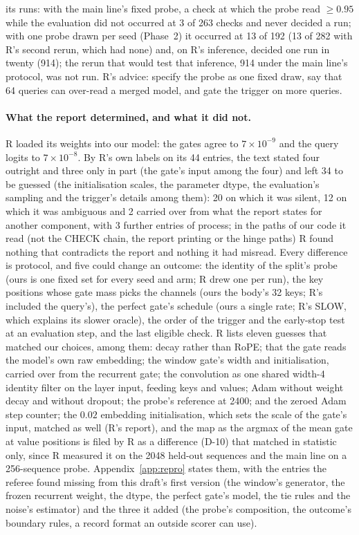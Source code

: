 \documentclass[11pt]{article}
\begin{document}
its runs: with the main line's fixed probe, a check at which the probe read $\geq 0.95$ while the evaluation did not occurred at 3 of 263 checks and never decided a run; with one probe drawn per seed (Phase~2) it occurred at 13 of 192 (13 of 282 with R's second rerun, which had none) and, on R's inference, decided one run in twenty (914); the rerun that would test that inference, 914 under the main line's protocol, was not run. R's advice: specify the probe as one fixed draw, say that 64 queries can over-read a merged model, and gate the trigger on more queries.

\paragraph{What the report determined, and what it did not.} R loaded its weights into our model: the gates agree to $7\times10^{-9}$ and the query logits to $7\times10^{-8}$. By R's own labels on its 44 entries, the text stated four outright and three only in part (the gate's input among the four) and left 34 to be guessed (the initialisation scales, the parameter dtype, the evaluation's sampling and the trigger's details among them): 20 on which it was silent, 12 on which it was ambiguous and 2 carried over from what the report states for another component, with 3 further entries of process; in the paths of our code it read (not the CHECK chain, the report printing or the hinge paths) R found nothing that contradicts the report and nothing it had misread. Every difference is protocol, and five could change an outcome: the identity of the split's probe (ours is one fixed set for every seed and arm; R drew one per run), the key positions whose gate mass picks the channels (ours the body's 32 keys; R's included the query's), the perfect gate's schedule (ours a single rate; R's SLOW, which explains its slower oracle), the order of the trigger and the early-stop test at an evaluation step, and the last eligible check. R lists eleven guesses that matched our choices, among them: decay rather than RoPE; that the gate reads the model's own raw embedding; the window gate's width and initialisation, carried over from the recurrent gate; the convolution as one shared width-4 identity filter on the layer input, feeding keys and values; Adam without weight decay and without dropout; the probe's reference at 2400; and the zeroed Adam step counter; the $0.02$ embedding initialisation, which sets the scale of the gate's input, matched as well (R's report), and the map as the argmax of the mean gate at value positions is filed by R as a difference (D-10) that matched in statistic only, since R measured it on the 2048 held-out sequences and the main line on a 256-sequence probe. Appendix~\ref{app:repro} states them, with the entries the referee found missing from this draft's first version (the window's generator, the frozen recurrent weight, the dtype, the perfect gate's model, the tie rules and the noise's estimator) and the three it added (the probe's composition, the outcome's boundary rules, a record format an outside scorer can use).
\end{document}
